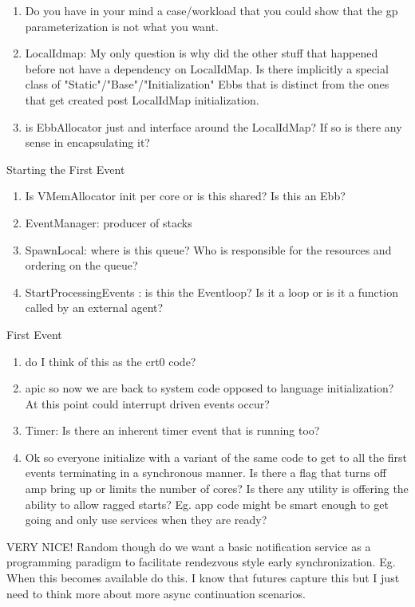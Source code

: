 \documentclass[11pt]{article}
\begin{document}
\begin{description}
\begin{enumerate}
        \item Do you have in your mind a case/workload that you could show that the gp 
              parameterization is not what you want.  
        \item LocalIdmap:  My only question is why did the other stuff that happened
              before not have a dependency on LocalIdMap.  Is there implicitly a special
              class of "Static"/"Base"/"Initialization" Ebbs that is distinct from 
              the ones that get created post LocalIdMap initialization.
        \item is EbbAllocator just and interface around the LocalIdMap?  If so 
              is there any sense in encapsulating it?
        \end{enumerate}
    \item{Starting the First Event}    
      \begin{enumerate}
        \item Is VMemAllocator init per core or is this shared?  Is this an Ebb?
        \item EventManager: producer of stacks
        \item SpawnLocal:  where is this queue?  Who is responsible for the resources and ordering on the queue?
        \item StartProcessingEvents : is this the Eventloop?  Is it a loop or is it 
              a function called by an external agent?
    \end{enumerate}
    \item{First Event}
\begin{enumerate}
  \item do I think of this as the crt0 code?
  \item apic so now we are back to system code opposed to language initialization?
        At this point could interrupt driven events occur?
  \item Timer:  Is there an inherent timer event that is running too?
  \item Ok so everyone initialize with a variant of the same code to get to 
        all the first events terminating in a synchronous manner.  Is there 
        a flag that turns off amp bring up or limits the number of cores?
        Is there any utility is offering the ability to allow ragged starts?
        Eg.  app code might be smart enough to get going and only use services
        when they are ready?
\end{enumerate}
\end{description}
VERY NICE!  Random though do we want a basic notification service as a programming paradigm to facilitate rendezvous style early synchronization. Eg.  When this becomes available do this.  I know that futures capture this but I just need to think more about
more async continuation scenarios.  
\end{document}
